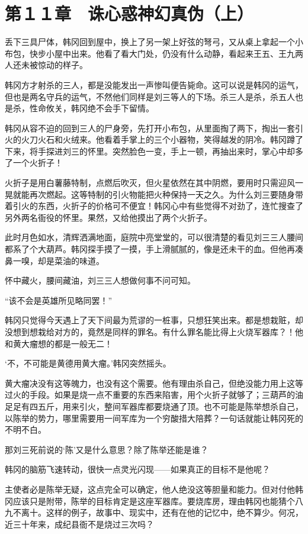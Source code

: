 \section{第１１章　诛心惑神幻真伪（上）}

丢下三具尸体，韩冈回到屋中，换上了另一架上好弦的弩弓，又从桌上拿起一个小布包，快步小屋中出来。他看了看大门处，仍没有什么动静，看起来王五、王九两人还未被惊动的样子。

韩冈方才射杀的三人，都是没能发出一声惨叫便告毙命。这可以说是韩冈的运气，但也是两名守兵的运气，不然他们同样是刘三等人的下场。杀三人是杀，杀五人也是杀，性命攸关，韩冈绝不会手下留情。

韩冈从容不迫的回到三人的尸身旁，先打开小布包，从里面掏了两下，掏出一套引火的火刀火石和火绒来。他看着手掌上的三个小器物，笑得越发的阴冷。韩冈蹲了下来，将手探进刘三的怀里。突然脸色一变，手上一顿，再抽出来时，掌心中却多了一个火折子！

火折子是用白薯藤特制，点燃后吹灭，但火星依然在其中阴燃，要用时只需迎风一晃就能再次燃起。这等特制的引火物能把火种保持一天之久。为什么刘三要随身带着引火的东西，火折子的价格可不便宜！韩冈心中有些觉得不对劲了，连忙搜查了另外两名衙役的怀里。果然，又给他摸出了两个火折子。

此时月色如水，清辉洒满地面，庭院中亮堂堂的，可以很清楚的看见刘三三人腰间都系了个大葫芦。韩冈探手摸了一摸，手上滑腻腻的，像是还未干的血。但他再凑鼻一嗅，却是菜油的味道。

怀中藏火，腰间藏油，刘三三人想做何事不问可知。

“该不会是英雄所见略同罢！”

韩冈只觉得今天遇上了天下间最为荒谬的一桩事，只想狂笑出来。都是想栽赃，却没想到想栽给对方的，竟然是同样的罪名。有什么罪名能比得上火烧军器库？！他和黄大瘤想的都是一般无二！

‘不，不可能是黄德用黄大瘤。’韩冈突然摇头。

黄大瘤决没有这等魄力，也没有这个需要。他有理由杀自己，但绝没能力用上这等过火的手段。如果是烧一点不重要的东西来陷害，用个火折子就够了；三葫芦的油足足有四五斤，用来引火，整间军器库都要烧通了顶。也不可能是陈举想杀自己，以陈举的势力，哪里需要用一间军库为一个穷酸措大陪葬？一句话就能让韩冈死的不明不白。

那刘三死前说的‘陈’又是什么意思？除了陈举还能是谁？

韩冈的脑筋飞速转动，很快一点灵光闪现——如果真正的目标不是他呢？

主使者必是陈举无疑，这点完全可以确定，他人绝没这等胆量和能力。但对付他韩冈应该只是附带，陈举的目标肯定是这座军器库。要烧库房，理由韩冈也能猜个八九不离十。这样的例子，故事中、现实中，还有在他的记忆中，绝不算少。何况，近三十年来，成纪县衙不是烧过三次吗？

